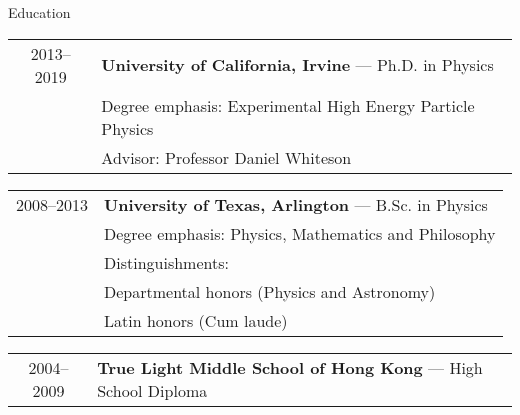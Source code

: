 
{\Large Education}\\
\HRule
\vspace{0.25in}

\hspace{0.18in}
\begin{tabular}{c|l}
     2013--2019 & {\bf{University of California, Irvine}} --- Ph.D. in Physics \\
			  & \hspace{0.5cm}Degree emphasis: Experimental High Energy Particle Physics \\
              & \hspace{0.5cm}Advisor: Professor Daniel Whiteson
\end{tabular}

\vspace{0.1in}
\hspace{0.18in}
\begin{tabular}{c|l}
    2008--2013 & {\bf{University of Texas, Arlington}} --- B.Sc. in Physics \\
              & \hspace{0.5cm}Degree emphasis: Physics, Mathematics and Philosophy \\
			  & \hspace{0.5cm}Distinguishments:\\
              & \hspace{0.8cm}Departmental honors (Physics and Astronomy) \\
              & \hspace{0.8cm}Latin honors (Cum laude) \\
\end{tabular}
\vspace{0.11in}

\hspace{0.18in}
\begin{tabular}{c|l}
    2004--2009 & {\bf{True Light Middle School of Hong Kong}} --- High School Diploma \\
\end{tabular}


